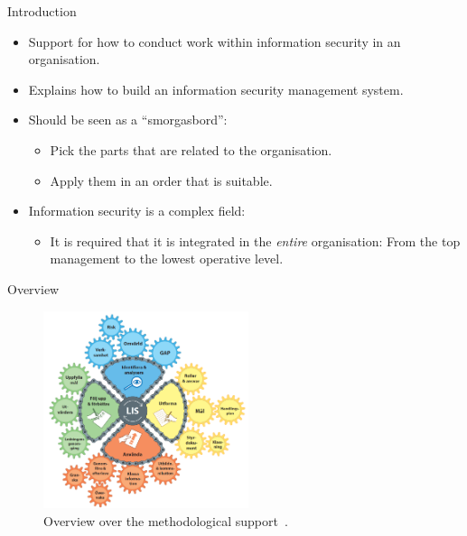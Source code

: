 \documentclass{beamer}
\begin{document}
\begin{frame}{Introduction}{\insertsectionhead}
  \begin{itemize}
    \item Support for how to conduct work within information security in an
      organisation.

    \item Explains how to build an information security management system.

    \item Should be seen as a \enquote{smorgasbord}:
      \begin{itemize}
        \item Pick the parts that are related to the organisation.
        \item Apply them in an order that is suitable.
      \end{itemize}

    \item Information security is a complex field:
      \begin{itemize}
        \item It is required that it is integrated in the \emph{entire}
          organisation: From the top management to the lowest operative level.
      \end{itemize}

  \end{itemize}
\end{frame}

\begin{frame}{Overview}{\insertsectionhead}
  \begin{figure}
    \includegraphics[width=6cm]{Figures/kugghjulet_lis.png}
    \caption{Overview over the methodological support~\cite{msb_metodstod}.}
  \end{figure}
\end{frame}
\end{document}
